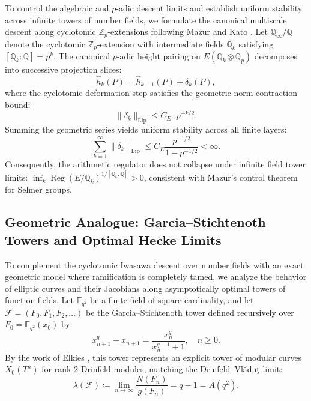 \documentclass[11pt,reqno]{article}
\theoremstyle{plain}
\theoremstyle{definition}
\DeclareMathOperator{\Reg}{Reg}
\begin{document}
To control the algebraic and $p$-adic descent limits and establish uniform stability across infinite towers of number fields, we formulate the canonical multiscale descent along cyclotomic $\mathbb{Z}_p$-extensions following Mazur and Kato \cite{mazur_1977, kato_2004}. Let $\mathbb{Q}_\infty / \mathbb{Q}$ denote the cyclotomic $\mathbb{Z}_p$-extension with intermediate fields $\mathbb{Q}_k$ satisfying $[\mathbb{Q}_k : \mathbb{Q}] = p^k$. The canonical $p$-adic height pairing on $E(\mathbb{Q}_k \otimes \mathbb{Q}_p)$ decomposes into successive projection slices:
\begin{equation}
    \hat{h}_k(P) = \hat{h}_{k-1}(P) + \delta_k(P),
\end{equation}
where the cyclotomic deformation step satisfies the geometric norm contraction bound:
\begin{equation}
    \label{eq:iwasawa_contraction}
    \|\delta_k\|_{\mathrm{Lip}} \le C_E \cdot p^{-k/2}.
\end{equation}
Summing the geometric series yields uniform stability across all finite layers:
\begin{equation}
    \sum_{k=1}^\infty \|\delta_k\|_{\mathrm{Lip}} \le C_E \frac{p^{-1/2}}{1 - p^{-1/2}} < \infty.
\end{equation}
Consequently, the arithmetic regulator does not collapse under infinite field tower limits: $\inf_{k} \Reg(E/\mathbb{Q}_k)^{1/[\mathbb{Q}_k:\mathbb{Q}]} > 0$, consistent with Mazur's control theorem for Selmer groups.

\subsection{Geometric Analogue: Garcia--Stichtenoth Towers and Optimal Hecke Limits}
\label{subsec:garcia_stichtenoth}

To complement the cyclotomic Iwasawa descent over number fields with an exact geometric model where ramification is completely tamed, we analyze the behavior of elliptic curves and their Jacobians along asymptotically optimal towers of function fields. Let $\mathbb{F}_{q^2}$ be a finite field of square cardinality, and let $\mathcal{F} = (F_0, F_1, F_2, \dots)$ be the Garcia--Stichtenoth tower \cite{garcia_stichtenoth_1995} defined recursively over $F_0 = \mathbb{F}_{q^2}(x_0)$ by:
\begin{equation}
    \label{eq:gs_recursion}
    x_{n+1}^q + x_{n+1} = \frac{x_n^q}{x_n^{q-1} + 1}, \quad n \ge 0.
\end{equation}
By the work of Elkies \cite{elkies_1998}, this tower represents an explicit tower of modular curves $X_0(T^n)$ for rank-2 Drinfeld modules, matching the Drinfeld--Vl\u{a}du\c{t} limit:
\begin{equation}
    \lambda(\mathcal{F}) \coloneqq \lim_{n \to \infty} \frac{N(F_n)}{g(F_n)} = q - 1 = A(q^2).
\end{equation}
\end{document}

